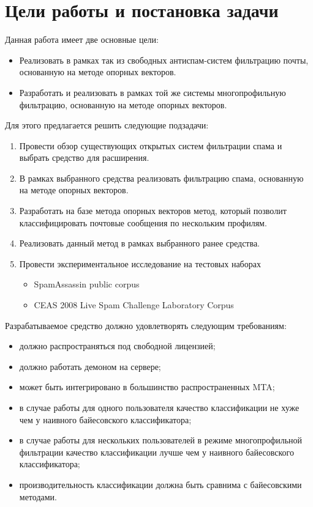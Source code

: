 \newpage
\section{Цели работы и постановка задачи}


Данная работа имеет две основные цели:
\begin{itemize}
\item Реализовать в рамках так из свободных антиспам-систем фильтрацию почты, основанную на методе опорных векторов.
\item Разработать и реализовать в рамках той же системы многопрофильную фильтрацию, основанную на методе опорных векторов.
\end{itemize}

Для этого предлагается решить следующие подзадачи:
\begin{enumerate}
\item  Провести обзор существующих открытых систем фильтрации спама и выбрать средство для расширения. 
\item В рамках выбранного средства реализовать фильтрацию спама, основанную на методе опорных векторов.
\item Разработать на базе метода опорных векторов метод, который позволит классифицировать почтовые сообщения по нескольким профилям.
\item Реализовать данный метод в рамках выбранного ранее средства.
\item Провести экспериментальное исследование на тестовых наборах
\begin{itemize}
    \item SpamAssassin public corpus
    \item CEAS 2008 Live Spam Challenge Laboratory Corpus
\end{itemize}
\end{enumerate}

Разрабатываемое средство должно удовлетворять следующим требованиям:
\begin{itemize}
\item должно распространяться под свободной лицензией;
\item должно работать демоном на сервере;
\item может быть интегрировано в большинство распространенных MTA;
\item в случае работы для одного пользователя качество классификации не хуже чем у наивного байесовского классификатора;
\item в случае работы для нескольких пользователей в режиме многопрофильной фильтрации качество классификации лучше чем у наивного байесовского классификатора;
\item производительность классификации должна быть сравнима с байесовскими методами.
\end{itemize}
